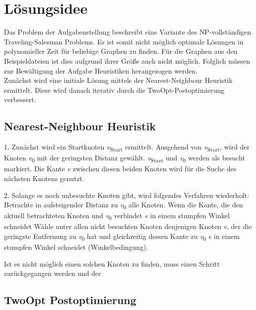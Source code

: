 \maketitle
\tableofcontents

\vspace{0.5cm}


\section{Lösungsidee}\label{sec:losungsidee}
Das Problem der Aufgabenstellung beschreibt eine Variante des NP-vollständigen Traveling-Salesman Problems.
Es ist somit nicht möglich optimale Lösungen in polynomieller Zeit für beliebige Graphen zu finden.
Für die Graphen aus den Beispieldateien ist dies aufgrund ihrer Größe auch nicht möglich.
Folglich müssen zur Bewältigung der Aufgabe Heuristiken herangezogen werden. \\
Zunächst wird eine initiale Lösung mittels der Nearest-Neighbour Heuristik ermittelt.
Diese wird danach iterativ durch die TwoOpt-Postoptimierung verbessert.

\subsection{Nearest-Neighbour Heuristik}\label{subsec:nearest-neighbour-heuristik}
1.
Zunächst wird ein Startknoten \textit{v}\textsubscript{Start} ermittelt.
Ausgehend von \textit{v}\textsubscript{Start}, wird der Knoten \textit{v}\textsubscript{0} mit der geringsten Distanz gewählt.
\textit{v}\textsubscript{Start} und \textit{v}\textsubscript{0} werden als besucht markiert.
Die Kante \textit{e} zwischen diesen beiden Knoten wird für die Suche des nächsten Knotens genutzt.

2.
Solange es noch unbesuchte Knoten gibt, wird folgendes Verfahren wiederholt:
Betrachte in aufsteigender Distanz zu \textit{v}\textsubscript{0} alle Knoten.
Wenn die Kante, die den aktuell betrachteten Knoten und \textit{v}\textsubscript{0} verbindet \textit{e}
in einem stumpfen Winkel schneidet
Wähle unter allen nicht besuchten Knoten denjenigen Knoten \textit{v}, der die geringste Entfernung zu \textit{v}\textsubscript{0}
hat und gleichzeitig dessen Kante zu \textit{v}\textsubscript{0} \textit{e} in einem stumpfen Winkel schneidet (Winkelbedingung).

Ist es nicht möglich einen solchen Knoten zu finden, muss einen Schritt zurückgegangen werden und der

\subsection{TwoOpt Postoptimierung}\label{subsec:twoopt-postoptimierung}



